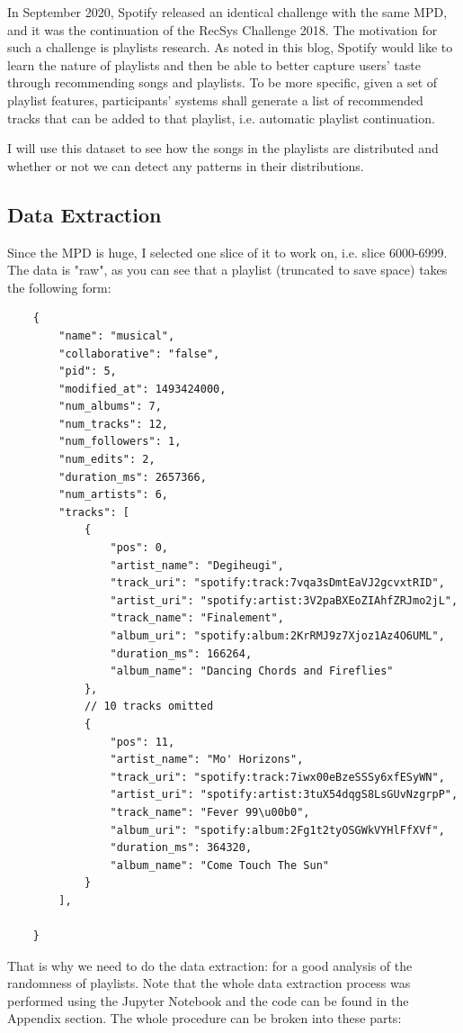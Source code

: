\documentclass[12pt]{article}
\theoremstyle{plain}
\theoremstyle{definition}
\theoremstyle{remark}
\begin{document}
In September 2020, Spotify released an identical challenge with the same MPD, and it was the continuation of the RecSys Challenge 2018. The motivation for such a challenge is playlists research. As noted in this blog\cite{2.1}, Spotify would like to learn the nature of playlists and then be able to better capture users' taste through recommending songs and playlists. To be more specific, given a set of playlist features, participants' systems shall generate a list of recommended tracks that can be added to that playlist, i.e. automatic playlist continuation.

I will use this dataset to see how the songs in the playlists are distributed and whether or not we can detect any patterns in their distributions.

\subsection{Data Extraction}
Since the MPD is huge, I selected one slice of it to work on, i.e. slice 6000-6999. The data is "raw", as you can see that a playlist (truncated to save space) takes the following form\cite{2.1}: 
\begin{verbatim}
    {
        "name": "musical",
        "collaborative": "false",
        "pid": 5,
        "modified_at": 1493424000,
        "num_albums": 7,
        "num_tracks": 12,
        "num_followers": 1,
        "num_edits": 2,
        "duration_ms": 2657366,
        "num_artists": 6,
        "tracks": [
            {
                "pos": 0,
                "artist_name": "Degiheugi",
                "track_uri": "spotify:track:7vqa3sDmtEaVJ2gcvxtRID",
                "artist_uri": "spotify:artist:3V2paBXEoZIAhfZRJmo2jL",
                "track_name": "Finalement",
                "album_uri": "spotify:album:2KrRMJ9z7Xjoz1Az4O6UML",
                "duration_ms": 166264,
                "album_name": "Dancing Chords and Fireflies"
            },
            // 10 tracks omitted
            {
                "pos": 11,
                "artist_name": "Mo' Horizons",
                "track_uri": "spotify:track:7iwx00eBzeSSSy6xfESyWN",
                "artist_uri": "spotify:artist:3tuX54dqgS8LsGUvNzgrpP",
                "track_name": "Fever 99\u00b0",
                "album_uri": "spotify:album:2Fg1t2tyOSGWkVYHlFfXVf",
                "duration_ms": 364320,
                "album_name": "Come Touch The Sun"
            }
        ],

    }
\end{verbatim}
That is why we need to do the data extraction: for a good analysis of the randomness of playlists. Note that the whole data extraction process was performed using the Jupyter Notebook and the code can be found in the Appendix section. The whole procedure can be broken into these parts: 
\end{document}
